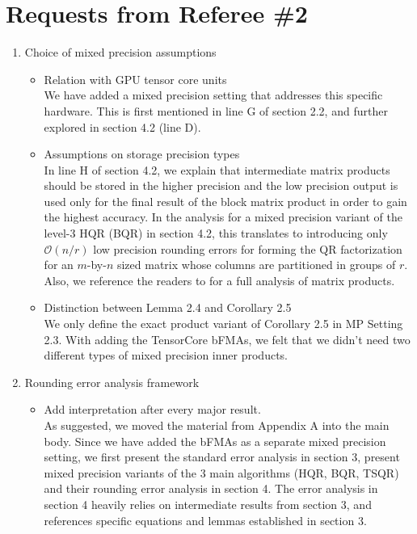 \documentclass[10pt]{article}
\newcommand{\cO}{\mathcal{O}}
\begin{document}
\section*{Requests from Referee \#2}
\begin{enumerate}\bfseries
	\item Choice of mixed precision assumptions
	\begin{itemize}
		\item Relation with GPU tensor core units\\
		{\normalfont We have added a mixed precision setting that addresses this specific hardware.
		This is first mentioned in line G of section 2.2, and further explored in section 4.2 (line D).	
	}
		\item Assumptions on storage precision types\\
		{\normalfont In line H of section 4.2, we explain that  intermediate matrix products should be stored in the higher precision and the low precision output is used only for the final result of the block matrix product in order to gain the highest accuracy.
		In the analysis for a mixed precision variant of the level-3 HQR (BQR) in section 4.2, this translates to introducing only $\cO(n/r)$ low precision rounding errors for forming the QR factorization for an $m$-by-$n$ sized matrix whose columns are partitioned in groups of $r$.
		Also, we reference the readers to \cite{Blanchard2019} for a full analysis of matrix products. 
		}
		\item Distinction between Lemma 2.4 and Corollary 2.5\\
		{\normalfont 
		We only define the exact product variant of Corollary 2.5 in MP Setting 2.3. 
		With adding the TensorCore bFMAs, we felt that we didn't need two different types of mixed precision inner products. 
		}
	\end{itemize}
	\item Rounding error analysis framework
	\begin{itemize}\bfseries
		\item Add interpretation after every major result.\\ 
		{\normalfont
			As suggested, we moved the material from Appendix A into the main body. 
			Since we have added the bFMAs as a separate mixed precision setting, we first present the standard error analysis in section 3, present mixed precision variants of the 3 main algorithms (HQR, BQR, TSQR) and their rounding error analysis in section 4. 
			The error analysis in section 4 heavily relies on intermediate results from section 3, and references specific equations and lemmas established in section 3. 
}
\end{itemize}
\end{enumerate}
\end{document}
